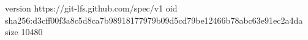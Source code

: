 version https://git-lfs.github.com/spec/v1
oid sha256:d3cff00f3a8c5d8ca7b98918177979b09d5cd79be12466b78abc63e91ec2a4da
size 10480
